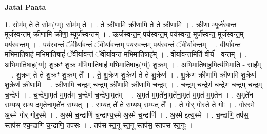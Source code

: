 \documentclass[17pt]{extarticle}
\begin{document}
\textbf{Jatai Paata} \newline

1. सोम॑म् ते ते॒ सोम॒(ग्म्॒) सोम॑म् ते । . ते॒ क्री॒णा॒मि॒ क्री॒णा॒मि॒ ते॒ ते॒ क्री॒णा॒मि॒ । . क्री॒णा॒ म्यूर्ज॑स्वन्त॒ मूर्ज॑स्वन्तम् क्रीणामि क्रीणा॒ म्यूर्ज॑स्वन्तम् । . ऊर्ज॑स्वन्त॒म् पय॑स्वन्त॒म् पय॑स्वन्त॒ मूर्ज॑स्वन्त॒ मूर्ज॑स्वन्त॒म् पय॑स्वन्तम् । . पय॑स्वन्तं ॅवी॒र्या॑वन्तं ॅवी॒र्या॑वन्त॒म् पय॑स्वन्त॒म् पय॑स्वन्तं ॅवी॒र्या॑वन्तम् । . वी॒र्या॑वन्त मभिमाति॒षाह॑ मभिमाति॒षाहं॑ ॅवी॒र्या॑वन्तं ॅवी॒र्या॑वन्त मभिमाति॒षाह᳚म् । . वी॒र्या॑वन्त॒मिति॑ वी॒र्य॑ - व॒न्त॒म् । . अ॒भि॒मा॒ति॒षाह(ग्म्॑) शु॒क्रꣳ शु॒क्र म॑भिमाति॒षाह॑ मभिमाति॒षाह(ग्म्॑) शु॒क्रम् । . अ॒भि॒मा॒ति॒षाह॒मित्य॑भिमाति - साह᳚म् । . शु॒क्रम् ते॑ ते शु॒क्रꣳ शु॒क्रम् ते᳚ । . ते॒ शु॒क्रेण॑ शु॒क्रेण॑ ते ते शु॒क्रेण॑ । . शु॒क्रेण॑ क्रीणामि क्रीणामि शु॒क्रेण॑ शु॒क्रेण॑ क्रीणामि । . क्री॒णा॒मि॒ च॒न्द्रम् च॒न्द्रम् क्री॑णामि क्रीणामि च॒न्द्रम् । . च॒न्द्रम् च॒न्द्रेण॑ च॒न्द्रेण॑ च॒न्द्रम् च॒न्द्रम् च॒न्द्रेण॑ । . च॒न्द्रेणा॒मृत॑ म॒मृत॑म् च॒न्द्रेण॑ च॒न्द्रेणा॒मृत᳚म् । . अ॒मृत॑ म॒मृते॑ना॒मृते॑ना॒मृत॑ म॒मृत॑ म॒मृते॑न । . अ॒मृते॑न स॒म्यथ् स॒म्य द॒मृते॑ना॒मृते॑न स॒म्यत् । . स॒म्यत् ते॑ ते स॒म्यथ् स॒म्यत् ते᳚ । . ते॒ गोर् गोस्ते॑ ते॒ गोः । . गोर॒स्मे अ॒स्मे गोर् गोर॒स्मे । . अ॒स्मे च॒न्द्राणि॑ च॒न्द्राण्य॒स्मे अ॒स्मे च॒न्द्राणि॑ । . अ॒स्मे इत्य॒स्मे । . च॒न्द्राणि॒ तप॑स॒ स्तप॑स श्च॒न्द्राणि॑ च॒न्द्राणि॒ तप॑सः । . तप॑स स्त॒नू स्त॒नू स्तप॑स॒ स्तप॑स स्त॒नूः । \newline
\end{document}
